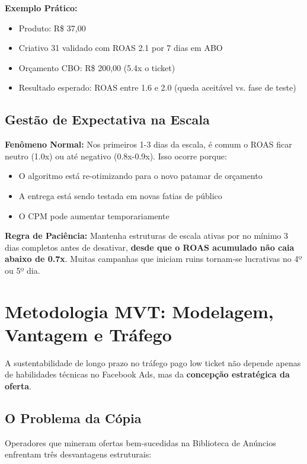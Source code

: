 \documentclass[12pt, a4paper]{article}
\newcommand{\reais}[1]{R\$ #1}
\begin{document}
\textbf{Exemplo Prático:}
\begin{itemize}
    \item Produto: \reais{37,00}
    \item Criativo 31 validado com ROAS 2.1 por 7 dias em ABO
    \item Orçamento CBO: \reais{200,00} (5.4x o ticket)
    \item Resultado esperado: ROAS entre 1.6 e 2.0 (queda aceitável vs. fase de teste)
\end{itemize}

\subsection{Gestão de Expectativa na Escala}

\textcolor{accentColor}{\textbf{Fenômeno Normal:}} Nos primeiros 1-3 dias da escala, é comum o ROAS ficar neutro (1.0x) ou até negativo (0.8x-0.9x). Isso ocorre porque:

\begin{itemize}
    \item O algoritmo está re-otimizando para o novo patamar de orçamento
    \item A entrega está sendo testada em novas fatias de público
    \item O CPM pode aumentar temporariamente
\end{itemize}

\textbf{Regra de Paciência:} Mantenha estruturas de escala ativas por no mínimo 3 dias completos antes de desativar, \textbf{desde que o ROAS acumulado não caia abaixo de 0.7x}. Muitas campanhas que iniciam ruins tornam-se lucrativas no 4º ou 5º dia.

\needspace{8cm}

\section{Metodologia MVT: Modelagem, Vantagem e Tráfego}

A sustentabilidade de longo prazo no tráfego pago low ticket não depende apenas de habilidades técnicas no Facebook Ads, mas da \textbf{concepção estratégica da oferta}.

\subsection{O Problema da Cópia}

Operadores que mineram ofertas bem-sucedidas na Biblioteca de Anúncios enfrentam três desvantagens estruturais:
\end{document}
